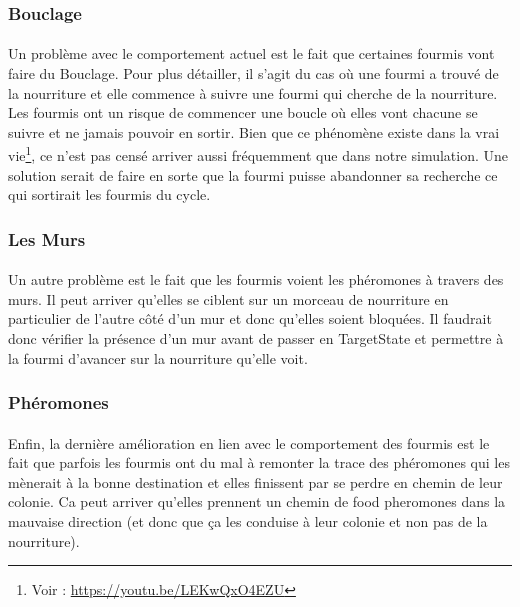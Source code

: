 \documentclass{EPUProjetDi}
\begin{document}
\subsubsection{Bouclage}

\paragraph{}
Un problème avec le comportement actuel est le fait que certaines fourmis vont faire du Bouclage. Pour plus détailler, il s'agit du cas
où une fourmi a trouvé de la nourriture et elle commence à suivre une fourmi qui cherche de la nourriture. 
Les fourmis ont un risque de commencer une boucle où elles vont chacune se suivre et ne jamais pouvoir en sortir.
Bien que ce phénomène existe dans la vrai vie\footnote{Voir : \url{https://youtu.be/LEKwQxO4EZU}}, ce n'est pas censé arriver aussi fréquemment que dans notre simulation.
Une solution serait de faire en sorte que la fourmi puisse abandonner sa recherche ce qui sortirait les fourmis du cycle.

\subsubsection{Les Murs}
\paragraph{}
Un autre problème est le fait que les fourmis voient les phéromones à travers des murs. Il peut arriver qu'elles se ciblent sur un morceau de 
nourriture en particulier de l'autre côté d'un mur et donc qu'elles soient bloquées.
Il faudrait donc vérifier la présence d'un mur avant de passer en TargetState et permettre à la fourmi d'avancer sur la nourriture qu'elle voit.

\subsubsection{Phéromones}
\paragraph{}
Enfin, la dernière amélioration en lien avec le comportement des fourmis est le fait que parfois les fourmis ont du mal à remonter la trace des phéromones qui les mènerait à la bonne destination et elles finissent par
se perdre en chemin de leur colonie. Ca peut arriver qu'elles prennent un chemin de food pheromones dans la mauvaise direction (et donc que ça les conduise à leur colonie et non pas de la nourriture).
\end{document}
